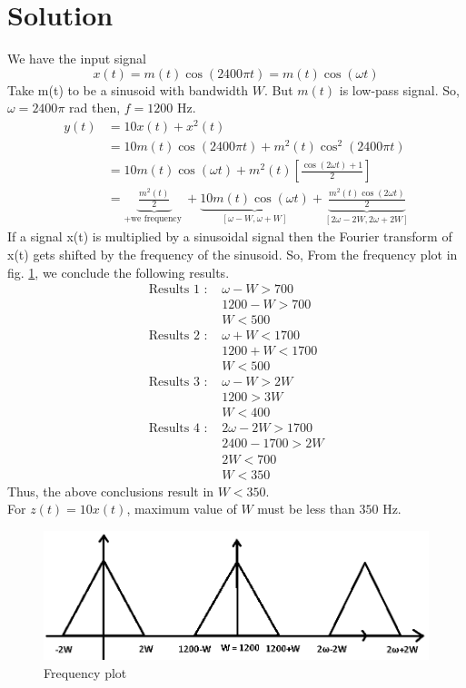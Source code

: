 \documentclass[journal,12pt,twocolumn]{IEEEtran}
\begin{document}
\section{Solution}
We have the input signal $$x(t)=m(t) \cos (2400 \pi t) = m(t) \cos (\omega t)$$ 
Take m(t) to be a sinusoid with bandwidth $W$. But $m(t)$ is low-pass signal. So, $\omega=2400 \pi$ rad then, $ f = 1200 $ Hz.
\begin{align}
y(t) &= 10 x(t)+x^{2}(t)\\
     &= 10 m(t) \cos (2400 \pi t)+m^{2}(t) \cos ^{2}(2400 \pi t) \\
     &= 10 m(t) \cos (\omega t)+ m^{2}(t)\left[\frac{\cos (2 \omega t)+1}{2}\right]\\
     &=\underbrace{\frac{m^{2}(t)}{2}}_{\text {+we frequency }}+\underbrace{10 m(t) \cos (\omega t)}_{[\omega-W, \omega+W]}+\underbrace{\frac{m^{2}(t) \cos (2 \omega t)}{2}}_{[2 \omega-2 W, 2 \omega+2 W]}
\end{align}
If a signal x(t) is multiplied by a sinusoidal signal then the Fourier transform of x(t) gets shifted by the frequency of the sinusoid. So, From the frequency plot in fig. \ref{freq}, we conclude the following results.
\begin{align}
\text {Results 1 : }&\omega-W>700 \\
& 1200-W>700 \\
& W<500 \\
\text {Results 2 : } &\omega+W<1700 \\
& 1200+W<1700 \\
& W<500 \\
\text {Results 3 : } &\omega -W>2 W \\
& 1200>3 W \\
& W<400 \\
\text {Results 4 : } &2 \omega-2 W>1700 \\
& 2400-1700>2 W \\
& 2 W<700 \\
& W<350
\end{align}
Thus, the above conclusions result in $W < 350$.\\
For $z(t)=10 x(t)$, maximum value of $W$ must be less than $350$ Hz.
\begin{figure}[!h]
\centering
\includegraphics[width=\columnwidth]{sol_1.png}
\caption{Frequency plot}
\label{freq}
\end{figure}
\end{document}
